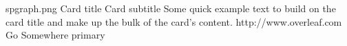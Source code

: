 \documentclass[12pt,a4paper]{article}
\begin{document}
\begin{card}
    {spgraph.png} %
    {Card title}
    {Card subtitle}
    {Some quick example text to build on the card title and make up the bulk of the card's content.}
    {http://www.overleaf.com} %
    {Go Somewhere} %
    {primary} %
\end{card}
\end{document}
